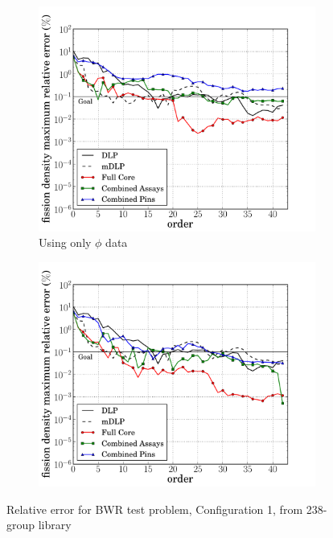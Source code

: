 \documentclass[5p,times,twocolumn,10pt]{elsarticle}
\begin{document}
    \begin{figure}[tb]
        \centering
        \begin{subfigure}{0.5\textwidth}
            \centering
            \includegraphics[trim=.1cm .25cm 2.0cm .4cm, clip=true,
            totalheight=0.261\textheight]
            {BWR1_238_energy_basis_comparison_fission-44}
            \caption{Using only $\phi$ data}
            \label{fig:core1-238a}
        \end{subfigure}%
        \begin{subfigure}{0.5\textwidth}
            \centering
            \includegraphics[trim=.1cm .25cm 2.0cm .4cm, clip=true,
            totalheight=0.261\textheight]
            {BWR1_238_partial_energy_basis_comparison_fission-44}
            \label{fig:core1-238b}
        \end{subfigure}
        \caption{Relative error for BWR test problem, Configuration 1, from
            238-group library}
        \label{fig:core1-238}
    \end{figure}
\end{document}
